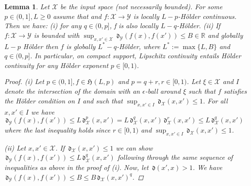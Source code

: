 \documentclass{article} %
\newtheorem{lem}[thm]{Lemma}
\theoremstyle{definition}
\theoremstyle{remark}
\newcommand{\Real}{\mathbb R}
\newcommand{\inspace}{\ensuremath{ \mathcal X}}
\newcommand{\outspace}{\ensuremath{ \mathcal Y}}
\newcommand{\metric}{\, \mathfrak{d}} %
\newcommand{\hoelset}[3]{\mathfrak{H}_{#2}(#1,#3)}
\begin{document}
\begin{lem} \label{lem:hoeldexpprop2}
Let $\inspace$ be the input space (not necessarily bounded). For some $p \in (0,1], L \geq 0$ assume that  and $f:\inspace \to \outspace$ is locally $L-p$-H\"older continuous.
Then we have: (i) for any $ q \in (0,p]$, f is also locally $L-q$-H\"older. 
(ii) If $f:\inspace \to \outspace$ is bounded with $\sup_{x,x' \in \inspace} \metric_\outspace (f(x),f(x')) \leq B \in \Real$ and globally $L-p$ H\"older then $f$ is globally $L^*-q$-H\"older, where $L^* := \max\{L,B \}$ and $q \in (0,p]$. In particular, on compact support, Lipschitz continuity entails \emph{H\"older} continuity for any H\"older exponent $p \in [0,1)$.
\begin{proof}
(i) Let $p \in (0,1], f \in \hoelset L { } p $ and $p = q+r, r \in [0,1)$. Let $\xi \in \inspace$ and $I$ denote the intersection of the domain with an $\epsilon$-ball around $\xi$ such that $f$ satisfies the H\"older condition on $I$ and such that $\sup_{x,x' \in I} \metric_\inspace(x,x') \leq 1$.  For all $x,x' \in I$ we have $\metric_\outspace (f(x),f(x')) \leq L\metric_\inspace^p (x,x') = L \metric_\inspace^q(x,x') \metric_\inspace^r(x,x') \leq L \metric_\inspace^q(x,x')$ where the last inequality holds since $r \in [0,1)$ and $\sup_{x,x' \in I} \metric_\inspace(x,x') \leq 1$.

(ii) Let $x,x' \in \inspace$. If $\metric_\inspace(x,x') \leq 1$ we can show $\metric_\outspace (f(x),f(x'))  \leq L \metric_\inspace^q(x,x')$ following through the same sequence of inequalities as above in the proof of (i). Now, let $\metric(x',x) >1$. We have $\metric_\outspace (f(x),f(x')) \leq B \leq B  \metric_\inspace(x,x')^q$.
\end{proof}
\end{lem}

\end{document}
